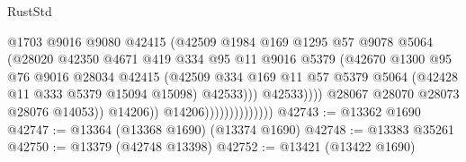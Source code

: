 \begin{lexlean}{RustStd}
\begin{coremodule}
                                              @1703
                                              @9016
                                              @9080
                                              @42415
                                              (@42509
                                                @1984
                                                @169
                                                @1295
                                                @57
                                                @9078
                                                @5064
                                                (@28020
                                                  @42350
                                                  @4671
                                                  @419
                                                  @334
                                                  @95
                                                  @11
                                                  @9016
                                                  @5379
                                                  (@42670
                                                    @1300
                                                    @95
                                                    @76
                                                    @9016
                                                    @28034
                                                    @42415
                                                    (@42509
                                                      @334
                                                      @169
                                                      @11
                                                      @57
                                                      @5379
                                                      @5064
                                                      (@42428 @11 @333 @5379 @15094 @15098)
                                                      @42533)))
                                                @42533))))
                                        @28067
                                        @28070
                                        @28073
                                        @28076
                                        @14053))
                                    @14206))
                                @14206))))))))))))))
@42743 := @13362 @1690
@42747 := @13364 (@13368 @1690) (@13374 @1690)
@42748 := @13383 @35261
@42750 := @13379 (@42748 @13398)
@42752 := @13421 (@13422 @1690)

\end{coremodule}
\end{lexlean}

